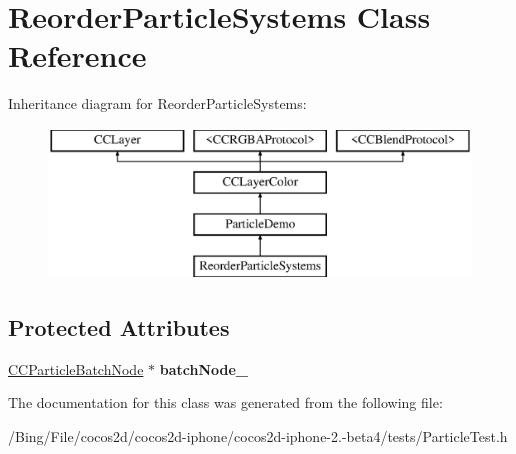 \hypertarget{interface_reorder_particle_systems}{\section{Reorder\-Particle\-Systems Class Reference}
\label{interface_reorder_particle_systems}
}
Inheritance diagram for Reorder\-Particle\-Systems\-:\begin{figure}[H]
\begin{center}
\leavevmode
\includegraphics[height=4.000000cm]{interface_reorder_particle_systems}
\end{center}
\end{figure}
\subsection*{Protected Attributes}
\begin{DoxyCompactItemize}
\item 
\hypertarget{interface_reorder_particle_systems_ae33ace16fae2ecbf94a514293a6e3306}{\hyperlink{interface_c_c_particle_batch_node}{C\-C\-Particle\-Batch\-Node} $\ast$ {\bfseries batch\-Node\-\_\-}}\label{interface_reorder_particle_systems_ae33ace16fae2ecbf94a514293a6e3306}

\end{DoxyCompactItemize}


The documentation for this class was generated from the following file\-:\begin{DoxyCompactItemize}
\item 
/\-Bing/\-File/cocos2d/cocos2d-\/iphone/cocos2d-\/iphone-\/2.-\/beta4/tests/Particle\-Test.\-h\end{DoxyCompactItemize}
